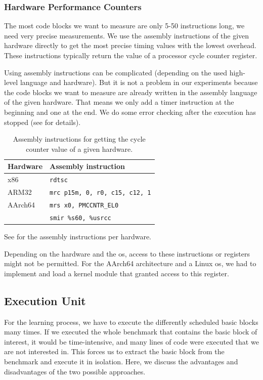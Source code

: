 \subsubsection{Hardware Performance Counters}
\label{sec:approach:hwpercounter}
The most code blocks we want to measure are only 5-50 instructions long, \ie we need very precise measurements.
We use the assembly instructions of the given hardware directly to get the most precise timing values with the lowest overhead.
These instructions typically return the value of a processor cycle counter register.

Using assembly instructions can be complicated (depending on the used high-level language and hardware).
But it is not a problem in our experiments because the code blocks we want to measure are already written in the assembly language of the given hardware.
That means we only add a timer instruction at the beginning and one at the end.
We do some error checking after the execution has stopped (see  for details).
\begin{table}
    \centering
    \begin{tabular}{@{}ll@{}}
        \toprule
        Hardware & Assembly instruction \\
        \midrule
        x86 & \lstinline|rdtsc| \\
        ARM32 & \lstinline|mrc p15m, 0, r0, c15, c12, 1| \\
        AArch64 & \lstinline|mrs x0, PMCCNTR_EL0| \\
        \aurora{} & \lstinline|smir %s60, %usrcc| \\
        \bottomrule
    \end{tabular}
    \caption{Assembly instructions for getting the cycle counter value of a given hardware.}
    \label{tab:approach:asm_instrs_timing}
\end{table}
See  for the assembly instructions per hardware.

Depending on the hardware and the \ac{os}, access to these instructions or registers might not be permitted.
For the AArch64 architecture and a Linux \ac{os}, we had to implement and load a kernel module that granted access to this register.
 

\subsection{Execution Unit}
\label{sec:approach:exec_unit}
For the learning process, we have to execute the differently scheduled basic blocks many times.
If we executed the whole benchmark that contains the basic block of interest, it would be time-intensive, and many lines of code were executed that we are not interested in.
This forces us to extract the basic block from the benchmark and execute it in isolation.
Here, we discuss the advantages and disadvantages of the two possible approaches.

